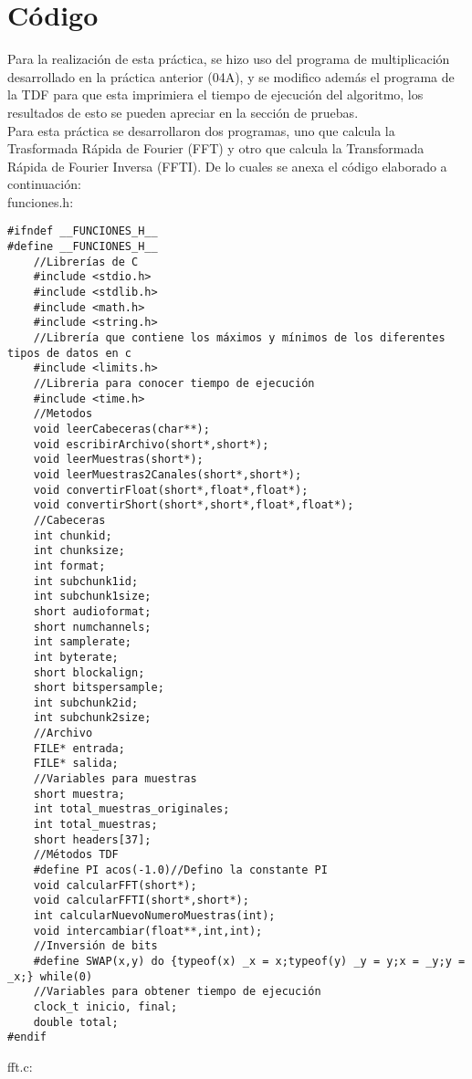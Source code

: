 \section{Código}
Para la realización de esta práctica, se hizo uso del programa de multiplicación desarrollado en la práctica anterior (04A), y se modifico además el programa de la TDF para que esta imprimiera el tiempo de ejecución del algoritmo, los resultados de esto se pueden apreciar en la sección de pruebas.\\ Para esta práctica se desarrollaron dos programas, uno que calcula la Trasformada Rápida de Fourier (FFT) y otro que calcula la Transformada Rápida de Fourier Inversa (FFTI). De lo cuales se anexa el código elaborado a continuación:\\
funciones.h:
\begin{lstlisting}[style=CStyle]
#ifndef __FUNCIONES_H__
#define __FUNCIONES_H__
	//Librerías de C
	#include <stdio.h>
	#include <stdlib.h>
	#include <math.h>
	#include <string.h>
	//Librería que contiene los máximos y mínimos de los diferentes tipos de datos en c
	#include <limits.h>
	//Libreria para conocer tiempo de ejecución
	#include <time.h>
	//Metodos
	void leerCabeceras(char**);
	void escribirArchivo(short*,short*);
	void leerMuestras(short*);
	void leerMuestras2Canales(short*,short*);
	void convertirFloat(short*,float*,float*);
	void convertirShort(short*,short*,float*,float*);
	//Cabeceras
	int chunkid;
	int chunksize;
	int format;
	int subchunk1id;
	int subchunk1size;
	short audioformat;
	short numchannels;
	int samplerate;
	int byterate;
	short blockalign;
	short bitspersample;
	int subchunk2id;
	int subchunk2size;
	//Archivo
	FILE* entrada;
	FILE* salida;
	//Variables para muestras
	short muestra;
	int total_muestras_originales;
	int total_muestras;
	short headers[37];
	//Métodos TDF
	#define PI acos(-1.0)//Defino la constante PI
	void calcularFFT(short*);
	void calcularFFTI(short*,short*);
	int calcularNuevoNumeroMuestras(int);
	void intercambiar(float**,int,int);
	//Inversión de bits
	#define SWAP(x,y) do {typeof(x) _x = x;typeof(y) _y = y;x = _y;y = _x;} while(0)
	//Variables para obtener tiempo de ejecución
	clock_t inicio, final;
	double total;
#endif
\end{lstlisting}
fft.c:
